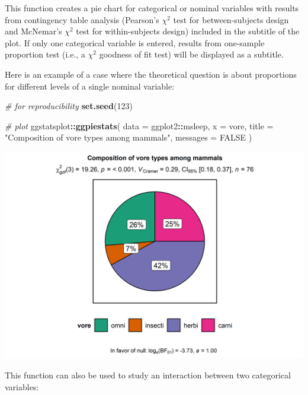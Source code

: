 \documentclass[]{article}
\newenvironment{Shaded}{\begin{snugshade}}{\end{snugshade}}
\newcommand{\CommentTok}[1]{\textcolor[rgb]{0.56,0.35,0.01}{\textit{#1}}}
\newcommand{\DataTypeTok}[1]{\textcolor[rgb]{0.13,0.29,0.53}{#1}}
\newcommand{\DecValTok}[1]{\textcolor[rgb]{0.00,0.00,0.81}{#1}}
\newcommand{\KeywordTok}[1]{\textcolor[rgb]{0.13,0.29,0.53}{\textbf{#1}}}
\newcommand{\NormalTok}[1]{#1}
\newcommand{\OperatorTok}[1]{\textcolor[rgb]{0.81,0.36,0.00}{\textbf{#1}}}
\newcommand{\OtherTok}[1]{\textcolor[rgb]{0.56,0.35,0.01}{#1}}
\newcommand{\StringTok}[1]{\textcolor[rgb]{0.31,0.60,0.02}{#1}}
\begin{document}
This function creates a pie chart for categorical or nominal variables
with results from contingency table analysis (Pearson's \(\chi^2\) test
for between-subjects design and McNemar's \(\chi^2\) test for
within-subjects design) included in the subtitle of the plot. If only
one categorical variable is entered, results from one-sample proportion
test (i.e., a \(\chi^2\) goodness of fit test) will be displayed as a
subtitle.

Here is an example of a case where the theoretical question is about
proportions for different levels of a single nominal variable:

\begin{Shaded}
\begin{Highlighting}[]
\CommentTok{# for reproducibility}
\KeywordTok{set.seed}\NormalTok{(}\DecValTok{123}\NormalTok{)}

\CommentTok{# plot}
\NormalTok{ggstatsplot}\OperatorTok{::}\KeywordTok{ggpiestats}\NormalTok{(}
  \DataTypeTok{data =}\NormalTok{ ggplot2}\OperatorTok{::}\NormalTok{msleep,}
  \DataTypeTok{x =}\NormalTok{ vore,}
  \DataTypeTok{title =} \StringTok{"Composition of vore types among mammals"}\NormalTok{,}
  \DataTypeTok{messages =} \OtherTok{FALSE}
\NormalTok{)}
\end{Highlighting}
\end{Shaded}

\includegraphics[width=1\linewidth]{./figures/paper-ggpiestats1-1}

This function can also be used to study an interaction between two
categorical variables:
\end{document}
